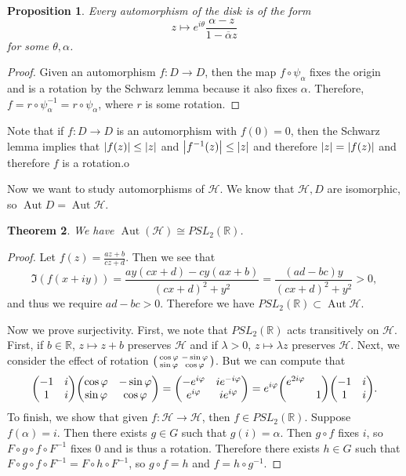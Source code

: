 \documentclass[leqno, openany]{memoir}
\newtheorem{thm}{Theorem}[section]
\newtheorem{prop}[thm]{Proposition}
\theoremstyle{definition}
\theoremstyle{remark}
\theoremstyle{plain}
\theoremstyle{definition}
\theoremstyle{remark}
\newcommand{\R}{\mathbb{R}}
\newcommand{\mc}[1]{\mathcal{#1}}
\newcommand{\ol}[1]{\overline{#1}}
\DeclareMathOperator{\Aut}{Aut}
\begin{document}
\begin{prop} Every automorphism of the disk is of the form \[ z \mapsto
e^{i\theta} \frac{\alpha - z}{1 - \ol{\alpha} z} \] for some $\theta, \alpha$.
\end{prop}

\begin{proof} Given an automorphism $f \colon D \to D$, then the map $f \circ
    \psi_{\alpha}$ fixes the origin and is a rotation by the Schwarz lemma
    because it also fixes $\alpha$. Therefore, $f = r \circ \psi_{\alpha}^{-1}
    = r \circ \psi_{\alpha}$, where $r$ is some rotation.  \end{proof}

Note that if $f \colon D \to D$ is an automorphism with $f(0) = 0$, then the
Schwarz lemma implies that $\abs{f(z)} \leq \abs{z}$ and $\abs{f^{-1}(z)} \leq
\abs{z}$ and therefore $\abs{z} = \abs{f(z)}$ and therefore $f$ is a rotation.o

Now we want to study automorphisms of $\mc{H}$. We know that $\mc{H}, D$ are
isomorphic, so $\Aut D = \Aut \mc{H}$.

\begin{thm} We have $\Aut(\mc{H}) \cong PSL_2(\R)$.  \end{thm}

\begin{proof} Let $f(z) = \frac{az + b}{cz + d}$. Then we see that \[
\Im(f(x+iy)) = \frac{ay(cx+d) - cy(ax+b)}{{(cx+d)}^2 + y^2} =
\frac{(ad-bc)y}{{(cx+d)}^2 + y^2} > 0, \] and thus we require $ad - bc > 0$.
Therefore we have $PSL_2(\R) \subset \Aut \mc{H}$.

    Now we prove surjectivity. First, we note that $PSL_2(\R)$ acts
    transitively on $\mc{H}$. First, if $b \in \R$, $z \mapsto z + b$ preserves
    $\mc{H}$ and if $\lambda > 0$, $z \mapsto \lambda z$ preserves $\mc{H}$.
    Next, we consider the effect of rotation $ \begin{psmallmatrix} \cos
        \varphi & - \sin \varphi \\ \sin \varphi & \cos \varphi
        \end{psmallmatrix}$. But we can compute that \[ \mqty(-1 & i \\ 1 & i)
    \mqty( \cos \varphi & - \sin \varphi \\ \sin \varphi & \cos \varphi ) =
\mqty(-e^{i\varphi} & ie^{-i\varphi} \\ e^{i\varphi} & ie^{i\varphi}) =
e^{i\varphi} \mqty(e^{2i\varphi} & \\ & 1) \mqty(-1 & i \\ 1 & i). \] To
finish, we show that given $f \colon \mc{H} \to \mc{H}$, then $f \in
PSL_2(\R)$. Suppose $f(\alpha) = i$. Then there exists $g \in G$ such that
$g(i) = \alpha$. Then $g \circ f$ fixes $i$, so $F \circ g \circ f \circ
F^{-1}$ fixes $0$ and is thus a rotation. Therefore there exists $h \in G$ such
that $F \circ g \circ f \circ F^{-1} = F \circ h \circ F^{-1}$, so $g \circ f =
h$ and $f = h \circ g^{-1}$.  \end{proof}
\end{document}
